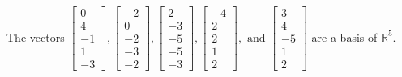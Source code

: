 \begin{exercise}
\begin{exerciseStatement}
  \end{exerciseStatement}
  \begin{exerciseAnswer}
   The vectors \(\left[\begin{array}{r}
0 \\
4 \\
-1 \\
1 \\
-3
\end{array}\right] , \left[\begin{array}{r}
-2 \\
0 \\
-2 \\
-3 \\
-2
\end{array}\right] , \left[\begin{array}{r}
2 \\
-3 \\
-5 \\
-5 \\
-3
\end{array}\right] , \left[\begin{array}{r}
-4 \\
2 \\
2 \\
1 \\
2
\end{array}\right] , \text{ and } \left[\begin{array}{r}
3 \\
4 \\
-5 \\
1 \\
2
\end{array}\right]\) 
  	 are  a basis of \(\mathbb{R}^5\).
  


  \end{exerciseAnswer}
\end{exercise}